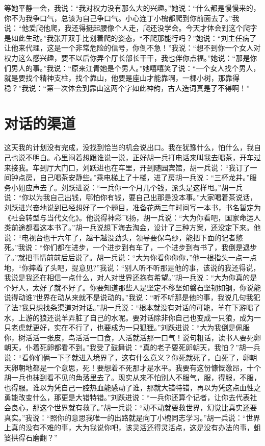 \documentclass[12pt,oneside]{book}
\begin{document}
等她平静一会，我说：``我对权力没有那么大的兴趣。''她说：``什么都是慢慢来的，你不为我争口气，总该为自己争口气。小心连丁小槐都爬到你前面去了。''我说：``他爱爬他爬，我还得挺起腰像个人走，爬还没学会。今天才体会到这个爬字是如此生动。''我张开双手比划着爬的姿态，``不爬那能行吗？''她说：``刘主任病了让他来代理，这是一个非常危险的信号，你倒不急！''我说：``想不到你一个女人对权力这么感兴趣，要不以后你弄个厅长部长干干，我也伴你点福。''她说：``那是你们男人的事。''我说：``原来江青她是个男人。''她嘻嘻笑了说：``一个女人找个男人，就是要找个精神支柱，找个靠山，他要是座山才能靠啊，一棵小树，那靠得稳？''我说：``第一次体会到靠山这两个字如此神韵，古人造词真是了不得啊！''


\chapter{对话的渠道}

这天我的计划没有完成，没找到恰当的机会说出口。我在犹豫什么，怕什么，我自己也说不明白。心里闷着想跟谁说一说，正好胡一兵打电话来叫我去喝茶，开车过来接我。车到厅大门口，刘跃进也在车里，开到随园宾馆，胡一兵说：``我订了一间钟点房，自己喝茶安静些。''乘电梯上了十楼，进了房胡一兵说：``三杯龙井。''服务小姐应声去了。刘跃进说：``一兵你一个月几个钱，派头是这样甩。''胡一兵说：``你以为我自己出钱，哪怕你有钱，要自己出那是没本事。''大家喝着茶说话，刘跃进兴奋地说到已经想好了一个题目，准备花两三年时间写一本书，书名暂定为《社会转型与当代文化》。他说得神彩飞扬，胡一兵说：``大为你看吧，国家命运人类前途都看这本书了。''胡一兵说想下海去淘金，设计了三种方案，还没定下来。他说：``电视台也干六年了，越干越没劲头，领导要保乌纱，能把下面的记者憋死。''我说：``你们都在进步，一个进步到有车了，一个进步到有书了，我倒是退步了。''就把事情前前后后说了。胡一兵说：``大为你看你你你，''他一根指头一点一点地，``你摔着了头吧，提意见?''我说：``别人听不听那是他的事，该说的我还得说，我说是我还在相信一点什么，对人对世界还抱有希望。''胡一兵说：``大为你真的是个好人，太好了就不好了。你要知道那些人是坚定不移坚如磐石坚韧如钢，你说能说得动谁?世界在动从来就不是说动的。''我说：``听不听那是他的事，我说几句我犯了法?我只想找条渠道对对话。''胡一兵说：``根本就没有对话的可能，羊在下游喝了水，上游的狼还说羊弄脏了自己的水呢。要对话除非你自己也变成一只狼，成为一只老虎就更好，实在不行了，也要成为一只狐狸。''刘跃进说：``大为我倒是佩服你，树活活一张皮，鸟活活一口食，人活就活那一口气！说句粗话，读书人要死卵朝天，仆着死卵都看不到。''我受了鼓舞说：``真的老子要死卵朝天，我怕？''胡一兵说：``看你们俩一下子就进入境界了，这有什么意义？你死就死了，白死了，卵朝天卵朝地都是一个意思，死！要想着不死那才是水平。我要有这份慷慨激昂，十个胡一兵也抹到看不见的角落里去了。现实从来不怕别人不服气，服，得服，不服，也得服。谁以为凭自己一腔热血能感动了谁，那就大错特错，再以为凭这点血性之勇能改变什么，那更是大错特错。''刘跃进说：``一兵你还算个记者，让你去代表社会良心，那这个世界就有救了。''胡一兵说：``动不动就要救世界，幻觉比真实还要真实。''我说：``照你的意思我唯一的出路就是向丁小槐同志学习。''胡一兵说：``世界上真的没有不难的事，大为我说你吧，该灵活还得灵活点，这是没有办法的事，蛆婆拱得石磨翻？''
\end{document}
